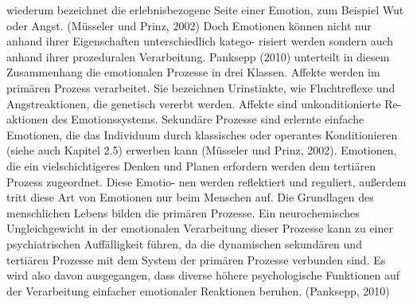 wiederum bezeichnet die erlebnisbezogene Seite einer Emotion, zum Beispiel Wut oder
Angst. (Müsseler und Prinz, 2002)
Doch Emotionen können nicht nur anhand ihrer Eigenschaften unterschiedlich katego-
risiert werden sondern auch anhand ihrer prozeduralen Verarbeitung. Panksepp (2010)
unterteilt in diesem Zusammenhang die emotionalen Prozesse in drei Klassen. Affekte
werden im primären Prozess verarbeitet. Sie bezeichnen Urinstinkte, wie Fluchtreflexe
und Angstreaktionen, die genetisch vererbt werden. Affekte sind unkonditionierte Re-
aktionen des Emotionssystems. Sekundäre Prozesse sind erlernte einfache Emotionen,
die das Individuum durch klassisches oder operantes Konditionieren (siehe auch Kapitel
2.5) erwerben kann (Müsseler und Prinz, 2002). Emotionen, die ein vielschichtigeres
Denken und Planen erfordern werden dem tertiären Prozess zugeordnet. Diese Emotio-
nen werden reflektiert und reguliert, außerdem tritt diese Art von Emotionen nur beim
Menschen auf. Die Grundlagen des menschlichen Lebens bilden die primären Prozesse.
Ein neurochemisches Ungleichgewicht in der emotionalen Verarbeitung dieser Prozesse
kann zu einer psychiatrischen Auffälligkeit führen, da die dynamischen sekundären und
tertiären Prozesse mit dem System der primären Prozesse verbunden sind. Es wird also
davon ausgegangen, dass diverse höhere psychologische Funktionen auf der Verarbeitung
einfacher emotionaler Reaktionen beruhen. (Panksepp, 2010)


